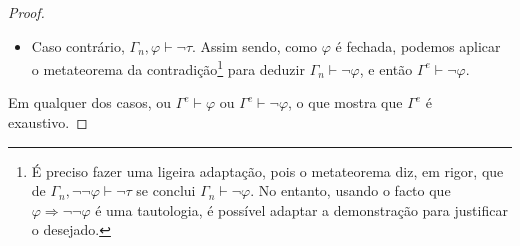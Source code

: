 \documentclass{report}
\theoremstyle{definition}
\theoremstyle{remark}
\newcommand{\imply}{\mathbin{\Rightarrow}}
\begin{document}
\begin{proof}
\begin{itemize}
	\item Caso contrário, $\Gamma_n, \varphi \vdash \neg \tau$. Assim sendo, como $\varphi$ é fechada, podemos aplicar o metateorema da contradição\footnote{É preciso fazer uma ligeira adaptação, pois o metateorema diz, em rigor, que de $\Gamma_n, \neg \neg \varphi \vdash \neg \tau$ se conclui $\Gamma_n \vdash \neg \varphi$. No entanto, usando o facto que $\varphi \imply \neg \neg \varphi$ é uma tautologia, é possível adaptar a demonstração para justificar o desejado.} para deduzir $\Gamma_n \vdash \neg \varphi$, e então $\Gamma^e \vdash \neg \varphi$.
	\end{itemize}
	
	Em qualquer dos casos, ou $\Gamma^e \vdash \varphi$ ou $\Gamma^e \vdash \neg \varphi$, o que mostra que $\Gamma^e$ é exaustivo.
	\end{proof}
	
\end{document}
